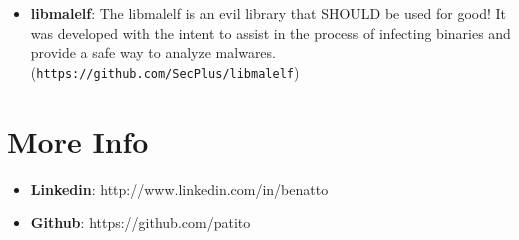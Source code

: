 \documentclass[margin]{res}
\begin{document}
\begin{resume}
\begin{itemize}
		    \item \textbf{libmalelf}: The libmalelf is an evil library that SHOULD be used for good! It was developed with the intent to assist in the process of infecting binaries and provide a safe way to analyze malwares. (\texttt{https://github.com/SecPlus/libmalelf})\vspace{1mm}
		                              
		\end{itemize}
 
\section{More Info}
    \begin{itemize}
        \item \textbf{Linkedin}: http://www.linkedin.com/in/benatto
         \item \textbf{Github}: https://github.com/patito
    \end{itemize}


\end{resume} 
\end{document}
